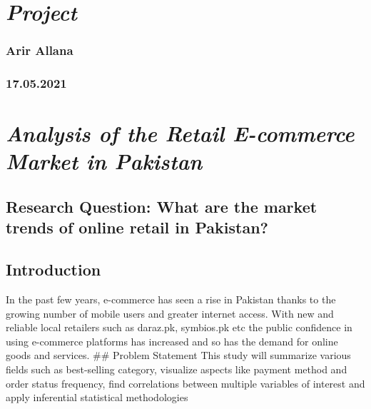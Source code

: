 \documentclass[
]{article}
\author{}
\date{\vspace{-2.5em}}
\begin{document}
\hypertarget{project}{%
\section{\texorpdfstring{\emph{Project}}{Project}}\label{project}}

\hypertarget{arir-allana}{%
\subsubsection{Arir Allana}\label{arir-allana}}

\hypertarget{section}{%
\subsubsection{17.05.2021}\label{section}}

\hypertarget{analysis-of-the-retail-e-commerce-market-in-pakistan}{%
\section{\texorpdfstring{\emph{Analysis of the Retail E-commerce Market
in
Pakistan}}{Analysis of the Retail E-commerce Market in Pakistan}}\label{analysis-of-the-retail-e-commerce-market-in-pakistan}}

\hypertarget{research-question-what-are-the-market-trends-of-online-retail-in-pakistan}{%
\subsection{Research Question: What are the market trends of online
retail in
Pakistan?}\label{research-question-what-are-the-market-trends-of-online-retail-in-pakistan}}

\hypertarget{introduction}{%
\subsection{Introduction}\label{introduction}}

In the past few years, e-commerce has seen a rise in Pakistan thanks to
the growing number of mobile users and greater internet access. With new
and reliable local retailers such as daraz.pk, symbios.pk etc the public
confidence in using e-commerce platforms has increased and so has the
demand for online goods and services. \#\# Problem Statement This study
will summarize various fields such as best-selling category, visualize
aspects like payment method and order status frequency, find
correlations between multiple variables of interest and apply
inferential statistical methodologies
\end{document}
